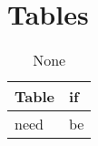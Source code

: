 \chapter{Tables}

\begin{table}
\caption{None}
\label{arm:table}
\begin{center}
\begin{tabular}{||l|l||}\hline
Table & if \\\hline
need  & be \\\hline
\end{tabular}
\end{center}
\end{table}

\clearpage
\newpage
